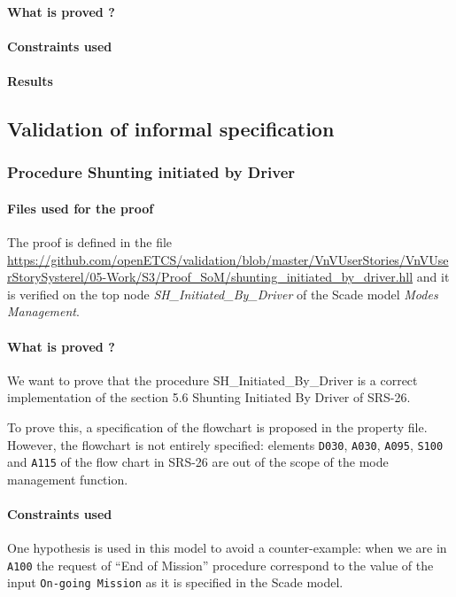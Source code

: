 \documentclass{article}
\begin{document}
\paragraph{What is proved ?}


\paragraph{Constraints used}


\paragraph{Results}


\subsection{Validation of informal specification}

\subsubsection{Procedure Shunting initiated by Driver}

\paragraph{Files used for the proof} The proof is defined in the file \url{https://github.com/openETCS/validation/blob/master/VnVUserStories/VnVUserStorySysterel/05-Work/S3/Proof_SoM/shunting_initiated_by_driver.hll} and it is verified on the top node \emph{SH\_Initiated\_By\_Driver} of the Scade model \emph{Modes Management}.

\paragraph{What is proved ?}
We want to prove that the procedure SH\_Initiated\_By\_Driver is a
correct implementation of the section 5.6 Shunting Initiated By Driver of SRS-26.

To prove this, a specification of the flowchart is proposed in the
property file. However, the flowchart is not entirely specified:
elements \texttt{D030}, \texttt{A030}, \texttt{A095}, \texttt{S100} and
\texttt{A115} of the flow chart in SRS-26 are out of the scope of the mode management function.

\paragraph{Constraints used}
One hypothesis is used in this model to avoid a counter-example: when we are in \texttt{A100} the request of ``End of
Mission'' procedure correspond to the value of the input
\texttt{On-going Mission} as it is specified in the Scade model.
\end{document}
